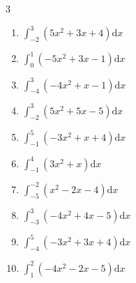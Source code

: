 \begin{multicols}{3}
\begin{enumerate}

  \item $\displaystyle \int_{-2}^{3}\left( 5x^{2}+3x+4 \right) \mathrm{d}x$


  \item $\displaystyle \int_{0}^{1}\left( -5x^{2}+3x-1 \right) \mathrm{d}x$


  \item $\displaystyle \int_{-4}^{3}\left( -4x^{2}+x-1 \right) \mathrm{d}x$

        \phantom{$\displaystyle =-126$}

  \item $\displaystyle \int_{-2}^{3}\left( 5x^{2}+5x-5 \right) \mathrm{d}x$


\columnbreak %

  \item $\displaystyle \int_{-1}^{5}\left( -3x^{2}+x+4 \right) \mathrm{d}x$

        \phantom{$\displaystyle =-110$}

  \item $\displaystyle \int_{-1}^{4}\left( 3x^{2}+x \right) \mathrm{d}x$


  \item $\displaystyle \int_{-5}^{-2}\left( x^{2}-2x-4 \right) \mathrm{d}x$

        \phantom{$\displaystyle =58$}

  \item $\displaystyle \int_{-3}^{3}\left( -4x^{2}+4x-5 \right) \mathrm{d}x$

        \phantom{$\displaystyle =-77$}

  \item $\displaystyle \int_{-4}^{5}\left( -3x^{2}+3x+4 \right) \mathrm{d}x$


\columnbreak %

  \item $\displaystyle \int_{1}^{2}\left( -4x^{2}-2x-5 \right) \mathrm{d}x$



\end{enumerate}
\end{multicols}
